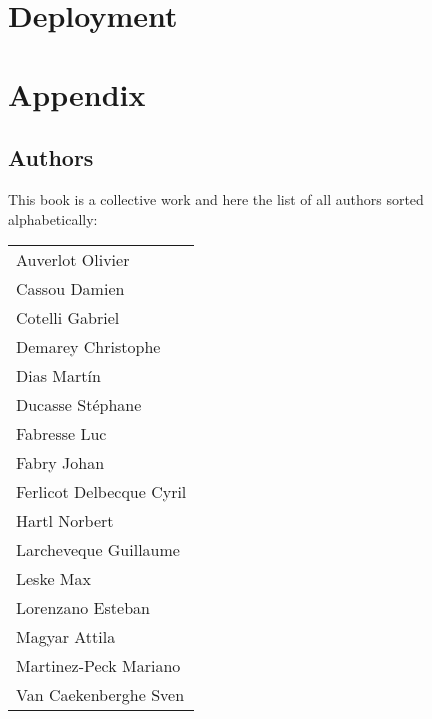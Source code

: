\documentclass[10pt,twoside]{support/latex/sbabook}
\begin{document}





\part{Deployment}



\appendix

\part{Appendix}

\chapter{Authors}

This book is a collective work and here the list of all authors sorted alphabetically:

\begin{tabular}{l}
Auverlot Olivier  \\
Cassou Damien\\
Cotelli Gabriel\\
Demarey Christophe\\
Dias Martín\\
Ducasse Stéphane\\
Fabresse Luc\\
Fabry Johan\\
Ferlicot Delbecque Cyril\\
Hartl Norbert\\
Larcheveque Guillaume\\
Leske Max\\
Lorenzano Esteban\\
Magyar Attila\\
Martinez-Peck Mariano\\
Van Caekenberghe Sven\\
\end{tabular}

\backmatter
\end{document}
